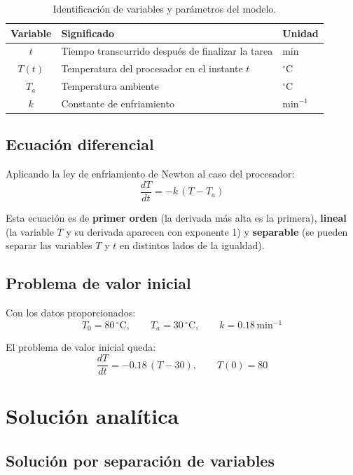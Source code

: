\documentclass[12pt,a4paper]{article}
\begin{document}
\begin{table}[H]
  \centering
  \begin{tabular}{cll}
    \toprule
    \textbf{Variable} & \textbf{Significado} & \textbf{Unidad} \\
    \midrule
    \(t\)   & Tiempo transcurrido después de finalizar la tarea & min \\
    \(T(t)\) & Temperatura del procesador en el instante \(t\)    & \({}^\circ\mathrm{C}\) \\
    \(T_a\)  & Temperatura ambiente                             & \({}^\circ\mathrm{C}\) \\
    \(k\)    & Constante de enfriamiento                       & \(\mathrm{min}^{-1}\) \\
    \bottomrule
  \end{tabular}
  \caption{Identificación de variables y parámetros del modelo.}
\end{table}

\subsection{Ecuación diferencial}

Aplicando la ley de enfriamiento de Newton al caso del procesador:
\[
\frac{dT}{dt} = -k\,(T - T_a)
\]

Esta ecuación es de \textbf{primer orden} (la derivada más alta es la primera), \textbf{lineal} (la variable \(T\) y su derivada aparecen con exponente 1) y \textbf{separable} (se pueden separar las variables \(T\) y \(t\) en distintos lados de la igualdad).

\subsection{Problema de valor inicial}

Con los datos proporcionados:
\[
T_0 = 80\,{}^\circ\mathrm{C},\qquad T_a = 30\,{}^\circ\mathrm{C},\qquad k = 0.18\,\mathrm{min}^{-1}
\]

El problema de valor inicial queda:
\[
\boxed{\displaystyle \frac{dT}{dt} = -0.18\,(T - 30)},\qquad \boxed{T(0) = 80}
\]

\section{Solución analítica}

\subsection{Solución por separación de variables}
\end{document}
